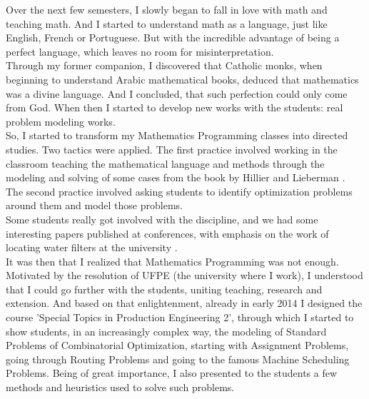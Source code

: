 \documentclass{book}
\begin{document}
Over the next few semesters, I slowly began to fall in love with math and teaching math. And I started to understand math as a language, just like English, French or Portuguese. But with the incredible advantage of being a perfect language, which leaves no room for misinterpretation. \\

Through my former companion, I discovered that Catholic monks, when beginning to understand Arabic mathematical books, deduced that mathematics was a divine language. And I concluded, that such perfection could only come from God. When then I started to develop new works with the students: real problem modeling works. \\

So, I started to transform my Mathematics Programming classes into directed studies. Two tactics were applied. The first practice involved working in the classroom teaching the mathematical language and methods through the modeling and solving of some cases from the book by Hillier and Lieberman \cite{HillierLieberman}. The second practice involved asking students to identify optimization problems around them and model those problems. \\

Some students really got involved with the discipline, and we had some interesting papers published at conferences, with emphasis on the work of locating water filters at the university \cite{AndradeAndFraga2016}. \\

It was then that I realized that Mathematics Programming was not enough. Motivated by the resolution of UFPE (the university where I work), I understood that I could go further with the students, uniting teaching, research and extension. And based on that enlightenment, already in early 2014 I designed the course 'Special Topics in Production Engineering 2', through which I started to show students, in an increasingly complex way, the modeling of Standard Problems of Combinatorial Optimization, starting with Assignment Problems, going through Routing Problems and going to the famous Machine Scheduling Problems. Being of great importance, I also presented to the students a few methods and heuristics used to solve such problems. \\
\end{document}
